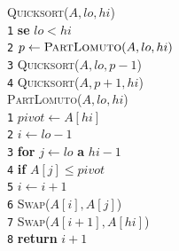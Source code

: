 \documentclass[10pt,landscape]{article}
\begin{document}
\begin{multicols*}{4}
                \begin{multicols}{2}
                        \textsc{Quicksort($A, lo, hi$)}\\ [3pt]
                        \verb|1|\hspace*{0.5em} \textbf{se} $lo < hi$\\
                        \verb|2|\hspace*{1.5em} $p \leftarrow \textsc{PartLomuto}(A, lo, hi)$\\
                        \verb|3|\hspace*{1.5em} \textsc{Quicksort}($A, lo, p - 1$)\\
                        \verb|4|\hspace*{1.5em} \textsc{Quicksort}($A, p + 1, hi$)\\
                        \columnbreak
                        \textsc{PartLomuto($A, lo, hi$)}\\
                        \verb|1|\hspace*{0.5em} $pivot \leftarrow A[hi]$\\
                        \verb|2|\hspace*{0.5em} $i \leftarrow lo - 1$\\
                        \verb|3|\hspace*{0.5em} \textbf{for} $j \leftarrow lo$ \textbf{a} $hi - 1$\\
                        \verb|4|\hspace*{1.5em} \textbf{if} $A[j] \le pivot$\\
                        \verb|5|\hspace*{2.5em} $i \leftarrow i + 1$\\
                        \verb|6|\hspace*{2.5em} \textsc{Swap}($A[i], A[j]$)\\
                        \verb|7|\hspace*{0.5em} \textsc{Swap}($A[i + 1], A[hi]$)\\
                        \verb|8|\hspace*{0.5em} \textbf{return} $i + 1$\\
                \end{multicols}


\end{multicols*}
\end{document}

